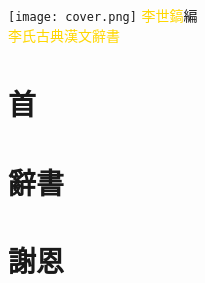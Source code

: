 \documentclass[a5paper,11pt]{report}
\begin{document}
\begin{titlepage}
\doublespacing
\hfill
\vfill
\hspace{-40mm}
\texttt{[image: cover.png]}
\vfill
{\textcolor{gold}{李世鎬}\hspace{14pt}編}\\
\vspace{14pt}
{\hspace{24pt}\huge\textcolor{gold}{李氏古典漢文辭書}}
\vfill
\end{titlepage}
\newpage
\chapter*{首}
\doublespacing


\chapter*{辭書}
\begin{multicols}{3}
\begin{flushleft}
\onehalfspacing

\end{flushleft}
\end{multicols}

\chapter*{謝恩}
\doublespacing

\end{document}
